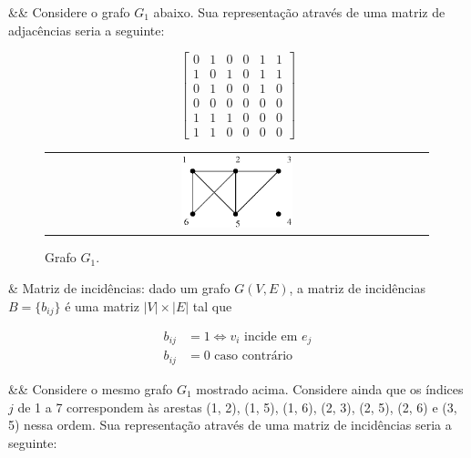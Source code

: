\begin{easylist}
  && Considere o grafo $G_1$ abaixo. Sua representação através de uma matriz de adjacências seria a seguinte:
\end{easylist}

\[
  \begin{bmatrix}
    0 & 1 & 0  &  0 & 1 & 1  \\
    1 & 0 & 1  &  0 & 1 & 1  \\
    0 & 1 & 0  &  0 & 1 & 0  \\
    0 & 0 & 0  &  0 & 0 & 0  \\
    1 & 1 & 1  &  0 & 0 & 0  \\
    1 & 1 & 0  &  0 & 0 & 0
  \end{bmatrix}
\]

\begin{figure}[h!]
  \begin{center}
    \begin{tabular}{c}
      \includegraphics[width=0.3\textwidth]{images/02/graph01.eps}
    \end{tabular}
  \end{center}
  \caption*{\label{fig:ex:01} Grafo $G_1$.}
\end{figure}

\SKIP
\SKIP
\SKIP
\SKIP

\begin{easylist}
  & Matriz de incidências: dado um grafo $G(V, E)$, a matriz de incidências $B = \{b_{ij}\}$ é uma matriz $|V| \times |E|$ tal que
\end{easylist}

  \begin{equation*}
    \begin{split}
b_{ij} & = 1 \Leftrightarrow v_i \mbox{ incide em } e_j \\
b_{ij} & = 0 \mbox{ caso contrário }
    \end{split}
  \end{equation*}

\begin{easylist}
  && Considere o mesmo grafo $G_1$ mostrado acima. Considere ainda que os índices $j$ de 1 a 7 correspondem às arestas (1, 2), (1, 5), (1, 6), (2, 3), (2, 5), (2, 6) e (3, 5) nessa ordem. Sua representação através de uma matriz de incidências seria a seguinte:
\end{easylist}

